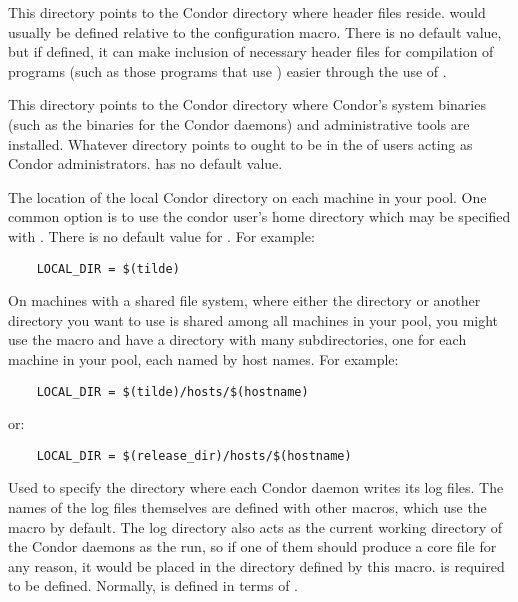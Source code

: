 \begin{description}
\label{param:Include}
\item[\Macro{INCLUDE}]
  This directory points to the Condor directory where header files reside.
   would usually be defined relative to
  the  configuration macro.
  There is no default value, but
  if defined, it can make inclusion of necessary header files
  for compilation of programs (such as those programs
  that use )
  easier through the use of .

\label{param:Sbin}
\item[\Macro{SBIN}]
  This directory points to the
  Condor directory where Condor's system binaries (such as the
  binaries for the Condor daemons) and administrative tools are
  installed.  Whatever directory  points to ought
  to be in the  of users acting as Condor
  administrators.   has no default value.

\label{param:LocalDir}
\item[\Macro{LOCAL\_DIR}]
  The location of the
  local Condor directory on each machine in your pool.  One common
  option is to use the condor user's home directory which may be
  specified with .  There is no default value for
  .  For example:
  \begin{verbatim}
    LOCAL_DIR = $(tilde)
  \end{verbatim}
  
  On machines with a shared file system, where either the
   directory or another directory you want to use is
  shared among all machines in your pool, you might use the
   macro and have a directory with many
  subdirectories, one for each machine in your pool, each named by
  host names.  For example:
  \begin{verbatim}
    LOCAL_DIR = $(tilde)/hosts/$(hostname)      
  \end{verbatim}
  or:
  \begin{verbatim}
    LOCAL_DIR = $(release_dir)/hosts/$(hostname)
  \end{verbatim}
  
\label{param:Log}
\item[\Macro{LOG}]
  Used to specify the
  directory where each Condor daemon writes its log files.  The names
  of the log files themselves are defined with other macros, which use
  the  macro by default.  The log directory also acts as
  the current working directory of the Condor daemons as the run, so
  if one of them should produce a core file for any reason, it would
  be placed in the directory defined by this macro.   is
  required to be defined.  Normally,  is defined in
  terms of .
  

\end{description}
